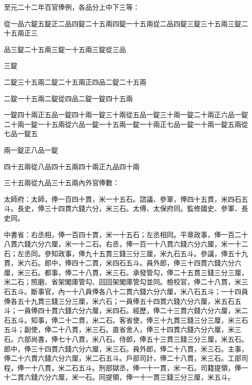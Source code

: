 \begin{pinyinscope}
 至元二十二年百官俸例，各品分上中下三等：



 從一品六錠五錠正二品四錠二十五兩四錠一十五兩從二品四錠三錠三十五兩三錠二十五兩正三



 品三錠二十五兩三錠一十五兩三錠從三品



 三錠



 二錠三十五兩二錠二十五兩正四品二錠二十五兩



 二錠一十五兩二錠從四品二錠一錠四十五兩



 一錠四十兩正五品一錠四十兩一錠三十兩從五品一錠三十兩一錠二十兩正六品一錠二十兩一錠一十五兩從六品一錠一十五兩一錠一十兩正七品一錠一十兩一錠五兩從七品一錠五



 兩一錠正八品一錠



 四十五兩從八品四十五兩四十兩正九品四十兩



 三十五兩從九品三十五兩內外官俸數：



 太師府：太師，俸一百四十貫，米一十五石。諮議、參軍，俸四十五貫，米四石五斗。長史，俸三十四貫六錢六分，米三石。太傅、太保府同。監修國史、參軍、長史同。



 中書省：右丞相，俸一百四十貫，米一十五石；左丞相同。平章政事，俸一百二十八貫六錢六分六厘，米一十二石。右丞，俸一百一十八貫六錢六分六厘，米一十二石；左丞同。參知政事，俸九十五貫三錢三分三厘，米九石五斗。參議，俸五十九貫，米六石。郎中，俸四十二貫，米四石五斗。員外郎，俸三十四貫六錢六分六厘，米三石。都事，俸二十八貫，米三石。承發管勾，俸二十五貫三錢三分三厘，米二石；照磨、省架閣庫管勾、回回架閣庫管勾並同。檢校官，俸二十八貫，米三石五斗。斷事官，內一十八員俸各八十二貫六錢六分六厘，米八石五斗；一十四員俸各五十九貫三錢三分三厘，米六石；一員俸五十四貫六錢六分六厘，米五石五斗；一員俸四十貫六錢六分六厘，米四石。經歷，俸二十三貫六錢六分六厘，米二石五斗。知事，俸二十二貫，米二石。客省使，俸三十九貫三錢三分三厘，米三石五斗；副使，俸二十八貫，米三石。直省舍人，俸三十四貫六錢六分六厘，米三石。六部尚書，俸七十八貫，米八石。侍郎，俸五十三貫三錢三分三厘，米五石。郎中，俸三十四貫六錢六分六厘，米三石。員外郎，俸二十八貫，米三石。主事，俸二十六貫六錢六分六厘，米二石五斗。戶部司計，俸二十八貫，米三石。工部司程，俸一十八貫，米二石五斗。刑部獄丞，俸一十一貫，米一石。司籍提領，俸一十二貫六錢六分六厘，米一石。同提領，俸一十一貫三錢三分三厘，米五斗。




\end{pinyinscope}

